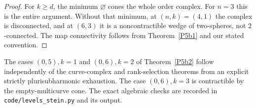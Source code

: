 \begin{proof}
For $k\ge d$, the minimum $\varnothing$ cones the whole order
complex.  For $n=3$ this is the entire argument.  Without that
minimum, at $(n,k)=(4,1)$ the complex is disconnected, and at
$(6,3)$ it is a noncontractible wedge of two-spheres, not
$2$-connected.  The map connectivity follows from
Theorem~\ref{P5b1} and our stated convention.
\end{proof}

\begin{proposition}\label{P5b3}
The cases $(0,5),k=1$ and $(0,6),k=2$ of Theorem~\ref{P5b2}
follow independently of the curve-complex and rank-selection
theorems from an explicit strictly plurisubharmonic exhaustion.
The case $(0,6),k=3$ is contractible by the empty-multicurve cone.
The exact algebraic checks are recorded in
\texttt{code/levels\_stein.py} and its output.
\end{proposition}
